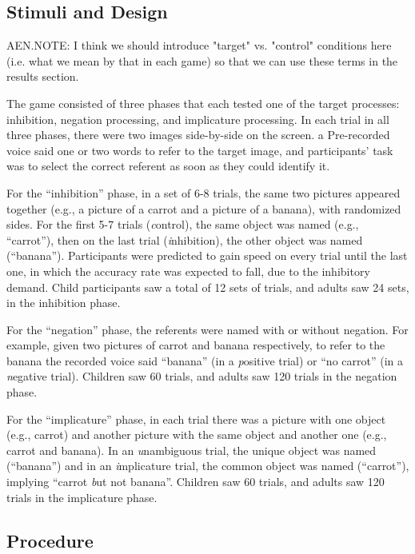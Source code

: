 \documentclass[10pt,letterpaper]{article}
\begin{document}
\subsection{Stimuli and Design}

AEN.NOTE: I think we should introduce "target" vs. "control" conditions here (i.e. what we mean by that in each game) so that we can use these terms in the results section.

The game consisted of three phases that each tested one of the target processes: inhibition, negation processing, and implicature processing. In each trial in all three phases, there were two images side-by-side on the screen. a Pre-recorded voice said one or two words to refer to the target image, and participants' task was to select the correct referent as soon as they could identify it.

For the ``inhibition'' phase, in a set of 6-8 trials, the same two pictures appeared together (e.g., a picture of a carrot and a picture of a banana), with randomized sides. For the first 5-7 trials ({\emph control}), the same object was named (e.g., ``carrot''), then on the last trial  ({\emph inhibition}), the other object was named (``banana''). Participants were predicted to gain speed on every trial until the last one, in which the accuracy rate was expected to fall, due to the inhibitory demand. Child participants saw a total of 12 sets of trials, and adults saw 24 sets, in the inhibition phase.

For the ``negation'' phase, the referents were named with or without negation. For example, given two pictures of carrot and banana respectively, to refer to the banana the recorded voice said ``banana'' (in a {\emph positive} trial) or ``no carrot'' (in a {\emph negative} trial). Children saw 60 trials, and adults saw 120 trials in the negation phase. 

For the ``implicature'' phase, in each trial there was a picture with one object (e.g., carrot) and another picture with the same object and another one (e.g., carrot and banana). In an {\emph unambiguous} trial, the unique object was named (``banana'') and in an {\emph implicature} trial, the common object was named (``carrot''), implying ``carrot {\emph but not banana''}. Children saw 60 trials, and adults saw 120 trials in the implicature phase. 

\subsection{Procedure}
\end{document}
